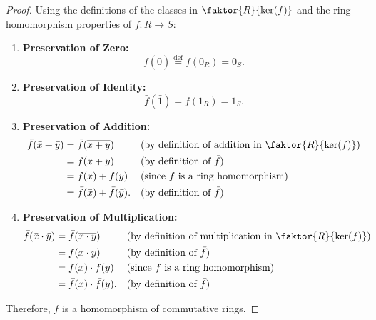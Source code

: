 \begin{proofWrapper}
\begin{content}
\begin{proof}
Using the definitions of the classes in $\faktor{R}{\ker(f)}$ and the ring homomorphism properties of $f \colon R \to S$:
\begin{enumerate}[label=\textbf{(\arabic*)}]
    \item \textbf{Preservation of Zero:}
    \[
    \bar{f}(\bar{0}) \stackrel{\text{def}}{=} f(0_R) = 0_S.
    \]
    \item \textbf{Preservation of Identity:}
    \[
    \bar{f}(\bar{1}) = f(1_R) = 1_S.
    \]
    \item \textbf{Preservation of Addition:}
    \begin{align*}
    \bar{f}(\bar{x} + \bar{y}) &= \bar{f}(\overline{x + y}) && \text{(by definition of addition in $\faktor{R}{\ker(f)}$)} \\
    &= f(x + y) && \text{(by definition of $\bar{f}$)} \\
    &= f(x) + f(y) && \text{(since $f$ is a ring homomorphism)} \\
    &= \bar{f}(\bar{x}) + \bar{f}(\bar{y}). && \text{(by definition of $\bar{f}$)}
    \end{align*}
    \item \textbf{Preservation of Multiplication:}
    \begin{align*}
    \bar{f}(\bar{x} \cdot \bar{y}) &= \bar{f}(\overline{x \cdot y}) && \text{(by definition of multiplication in $\faktor{R}{\ker(f)}$)} \\
    &= f(x \cdot y) && \text{(by definition of $\bar{f}$)} \\
    &= f(x) \cdot f(y) && \text{(since $f$ is a ring homomorphism)} \\
    &= \bar{f}(\bar{x}) \cdot \bar{f}(\bar{y}). && \text{(by definition of $\bar{f}$)}
    \end{align*}
\end{enumerate}
Therefore, $\bar{f}$ is a homomorphism of commutative rings.
\end{proof}
\end{content}

\begin{hidden}
\end{hidden}


\end{proofWrapper}
